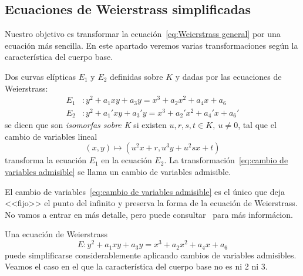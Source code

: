 \subsection{Ecuaciones de Weierstrass simplificadas}
\label{sub:Ecuaciones de Weierstrass simplificadas}

Nuestro objetivo es transformar la ecuación~\eqref{eq:Weierstrass general} por una ecuación más sencilla. En este apartado veremos varias transformaciones según la característica del cuerpo base.

\begin{definicion}
	Dos curvas elípticas $E_1$ y $E_2$ definidas sobre $K$ y dadas por las ecuaciones de Weierstrass:
	\begin{align*}
		E_1 &: y^2 + a_1 x y + a_3 y = x^3 + a_2 x^2 + a_4 x + a_6 \\
		E_2 &: y^2 + a_1' x y + a_3' y = x^3 + a_2' x^2 + a_4' x + a_6'
	\end{align*}
	se dicen que son \emph{isomorfas sobre K} si existen $u, r, s, t \in K,\ u \neq 0$, tal que el cambio de variables lineal
	\begin{equation}\label{eq:cambio de variables admisible}
	(x, y) \mapsto (u^2 x + r, u^3 y + u^2 s x + t)
	\end{equation}
	transforma la ecuación $E_1$ en la ecuación $E_2$. La transformación~\eqref{eq:cambio de variables admisible} se llama un cambio de variables admisible.

	El cambio de variables~\eqref{eq:cambio de variables admisible} es el único que deja <<fijo>> el punto del infinito y preserva la forma de la ecuación de Weierstrass. No vamos a entrar en más detalle, pero puede consultar~\cite[prop. III.3.1b]{Silverman:2009} para más informácion.
\end{definicion}

Una ecuación de Weierstrass
$$
E:  y^2 + a_1 x y + a_3 y = x^3 + a_2 x^2 + a_4 x + a_6
$$
puede simplificarse considerablemente aplicando cambios de variables admisibles. Veamos el caso en el que la característica del cuerpo base no es ni 2 ni 3.

